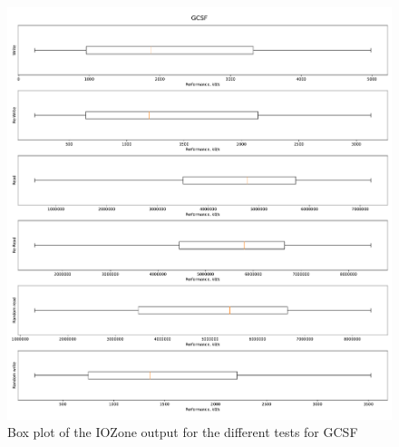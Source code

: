 \begin{figure}[!htb]
	\label{fig:res_box_gcsf}
	\begin{center}
		\includegraphics[width=1.0\textwidth]{figures/benchmarking/gcsf/GCSF-box.pdf}
	\end{center}
	\caption{Box plot of the IOZone output for the different tests for \gls{GCSF}}
\end{figure}

